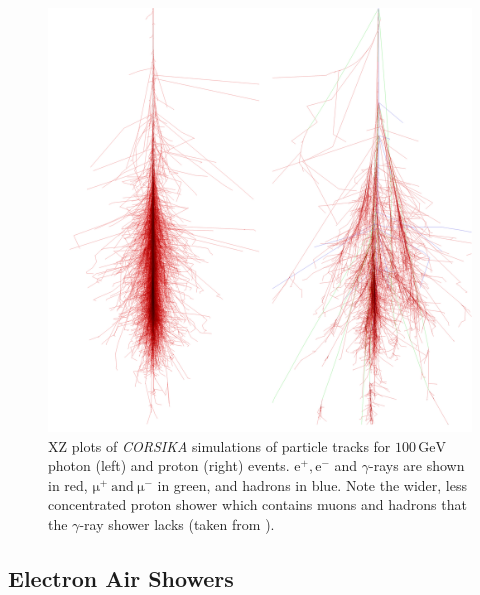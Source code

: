\begin{figure}
\begin{center}  

\includegraphics[width=\columnwidth]{figures/showers.png}
 
\caption{XZ plots of \textit{CORSIKA} simulations of particle tracks for $\mathrm{100\,GeV}$ photon (left) and proton (right) events. $\mathrm{e^+,e^-}$ and $\gamma$-rays are shown in red, $\mathrm{\mu^+\ and\ \mu^-}$ in green, and hadrons in blue. Note the wider, less concentrated proton shower which contains muons and hadrons that the $\gamma$-ray shower lacks (taken from \cite{corskplot}).}
\label{fig:image2}
\end{center}
\end{figure}
\subsection{Electron Air Showers}

